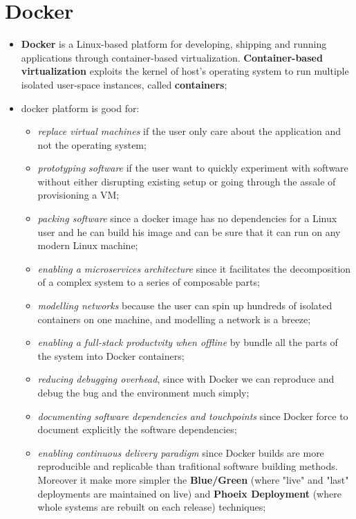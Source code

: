 \documentclass[oneside]{article}
\begin{document}
\section{Docker}
\begin{itemize}
    \item \textbf{Docker} is a Linux-based platform for developing, shipping and running applications through container-based virtualization. \textbf{Container-based virtualization} exploits the kernel of host's operating system to run multiple isolated user-space instances, called \textbf{containers};
    
    \item docker platform is good for:
        \begin{itemize}
            \item \textit{replace virtual machines} if the user only care about the application and not the operating system;
            \item \textit{prototyping software} if the user want to quickly experiment with software without either disrupting existing setup or going through the assale of provisioning a VM;
            \item \textit{packing software} since a docker image has no dependencies for a Linux user and he can build his image and can be sure that it can run on any modern Linux machine;
            \item \textit{enabling a microservices architecture} since it facilitates the decomposition of a complex system to a series of composable parts;
            \item \textit{modelling networks} because the user can spin up hundreds of isolated containers on one machine, and modelling a network is a breeze;
            \item \textit{enabling a full-stack productvity when offline} by bundle all the parts of the system into Docker containers;
            \item \textit{reducing debugging overhead}, since with Docker we can reproduce and debug the bug and the environment much simply;
            \item \textit{documenting software dependencies and touchpoints} since Docker force to document explicitly the software dependencies;
            \item \textit{enabling continuous delivery paradigm} since Docker builds are more reproducible and replicable than trafitional software building methods. Moreover it make more simpler the \textbf{Blue/Green} (where "live" and "last" deployments are maintained on live) and \textbf{Phoeix Deployment} (where whole systems are rebuilt on each release) techniques;
        \end{itemize}
        

\end{itemize}
\end{document}
